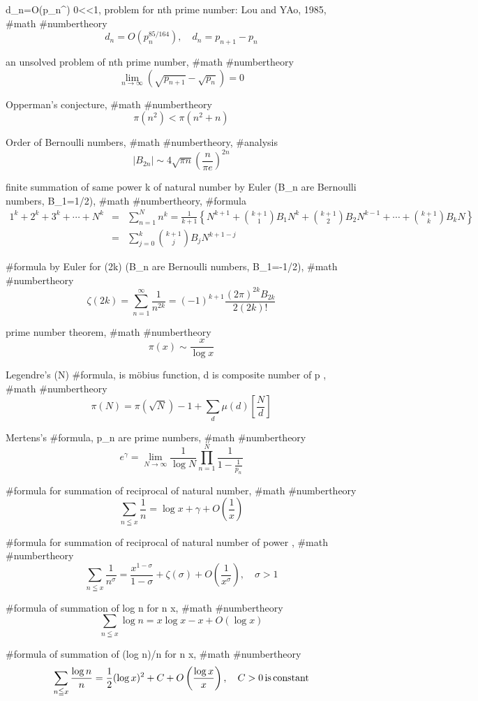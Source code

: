 d_n=O(p_n^\theta) 0<\theta <1, problem for nth prime number: Lou and YAo, 1985, #math #numbertheory
$$
d_n=O(p_n^{85/164}), \quad d_n=p_{n+1}-p_n
$$

an unsolved problem of nth prime number, #math #numbertheory
$$
\lim_{n \rightarrow \infty} (\sqrt{p_{n+1}}-\sqrt{p_n})=0
$$

Opperman’s conjecture, #math #numbertheory
$$
\pi(n^2)<\pi(n^2+n)
$$

Order of Bernoulli numbers, #math #numbertheory, #analysis
$$
|B_{2n}| \sim 4\sqrt{\pi n}\left(\frac{n}{\pi e}\right)^{2n}
$$

finite summation of same power k of natural number by Euler (B_n are Bernoulli numbers, B_1=1/2), #math #numbertheory, #formula
$$
\begin{array}{lll}
1^k+2^k+3^k+\cdots+N^k&=&\displaystyle \sum^N_{n=1} n^k=\frac{1}{k+1}\left\{N^{k+1}+\binom{k+1}{1}B_1 N^k+\binom{k+1}{2}B_2 N^{k-1}+\cdots+\binom{k+1}{k}B_k N\right\}\\
&=&\displaystyle \sum^k_{j=0}\binom{k+1}{j}B_j N^{k+1-j}
\end{array}
$$

#formula by Euler for \zeta(2k) (B_n are Bernoulli numbers, B_1=-1/2), #math #numbertheory
$$
\zeta(2k)=\sum^\infty_{n=1}\frac{1}{n^{2k}}=(-1)^{k+1}\frac{(2\pi)^{2k}B_{2k}}{2(2k)!}
$$

prime number theorem, #math #numbertheory
$$
\pi(x) \sim \frac{x}{\log x}
$$

Legendre’s \pi(N) #formula, \mu is möbius function, d is composite number of p \le {}, #math #numbertheory
$$
\pi(N) = \pi(\sqrt{N})-1+\sum_d\mu(d)\left[\frac{N}{d}\right]
$$

Mertens’s #formula, p_n are prime numbers, #math #numbertheory
$$
e^\gamma=\lim_{N \rightarrow \infty}\frac{1}{\log N}\prod^N_{n=1}\frac{1}{1-\frac{1}{p_n}}
$$

#formula for summation of reciprocal of natural number,  #math #numbertheory
$$
\sum_{n \leqq x}\frac{1}{n}=\log x+\gamma+O\left(\frac{1}{x}\right)
$$

#formula for summation of reciprocal of natural number of power \sigma, #math #numbertheory
$$
\sum_{n \leqq x}\frac{1}{n^\sigma}=\frac{x^{1-\sigma}}{1-\sigma}+\zeta(\sigma)+O\left(\frac{1}{x^\sigma}\right), \quad \sigma>1
$$

#formula of summation of log n for n \le x, #math #numbertheory
$$
\sum_{n \leqq x}\log n=x \log x-x+O(\log x)
$$

#formula of summation of (log n)/n for n \le x, #math #numbertheory
$$
\sum_{n \leqq x}\frac{\log n}{n}=\frac{1}{2}(\log x)^2+C+O\left(\frac{\log x}{x}\right), \quad C>0\,{\rm is}\,{\rm constant} 
$$


